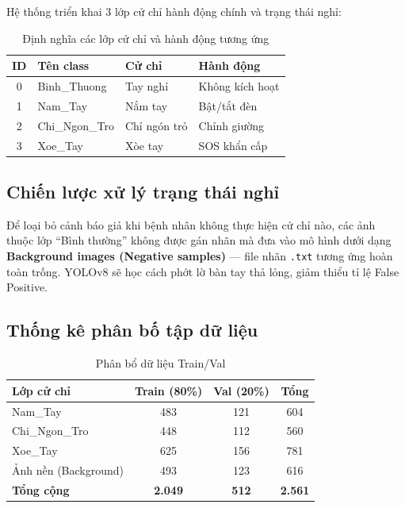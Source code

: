 \documentclass[conference]{IEEEtran}
\begin{document}
Hệ thống triển khai 3 lớp cử chỉ hành động chính và trạng thái nghỉ:

\begin{table}[h]
\centering
\caption{Định nghĩa các lớp cử chỉ và hành động tương ứng}
\label{tab:classes}
\begin{tabular}{c|l|l|l}
\hline
\textbf{ID} & \textbf{Tên class} & \textbf{Cử chỉ} & \textbf{Hành động} \\
\hline
0 & Binh\_Thuong & Tay nghỉ & Không kích hoạt \\
1 & Nam\_Tay & Nắm tay & Bật/tắt đèn \\
2 & Chi\_Ngon\_Tro & Chỉ ngón trỏ & Chỉnh giường \\
3 & Xoe\_Tay & Xòe tay & SOS khẩn cấp \\
\hline
\end{tabular}
\end{table}

\subsection{Chiến lược xử lý trạng thái nghỉ}

Để loại bỏ cảnh báo giả khi bệnh nhân không thực hiện cử chỉ nào, các ảnh thuộc lớp ``Bình thường'' không được gán nhãn mà đưa vào mô hình dưới dạng \textbf{Background images (Negative samples)} --- file nhãn \texttt{.txt} tương ứng hoàn toàn trống. YOLOv8 sẽ học cách phớt lờ bàn tay thả lỏng, giảm thiểu tỉ lệ False Positive.

\subsection{Thống kê phân bố tập dữ liệu}

\begin{table}[h]
\centering
\caption{Phân bổ dữ liệu Train/Val}
\label{tab:dataset}
\begin{tabular}{l|c|c|c}
\hline
\textbf{Lớp cử chỉ} & \textbf{Train (80\%)} & \textbf{Val (20\%)} & \textbf{Tổng} \\
\hline
Nam\_Tay & 483 & 121 & 604 \\
Chi\_Ngon\_Tro & 448 & 112 & 560 \\
Xoe\_Tay & 625 & 156 & 781 \\
Ảnh nền (Background) & 493 & 123 & 616 \\
\hline
\textbf{Tổng cộng} & \textbf{2.049} & \textbf{512} & \textbf{2.561} \\
\hline
\end{tabular}
\end{table}
\end{document}
